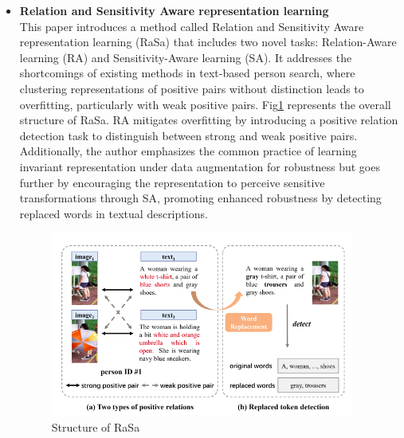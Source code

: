 \begin{itemize}
    \item \textbf{Relation and Sensitivity Aware representation learning}\\
    This paper introduces a method called Relation and Sensitivity Aware representation learning (RaSa) that includes two novel tasks: Relation-Aware learning (RA) and Sensitivity-Aware learning (SA). It addresses the shortcomings of existing methods in text-based person search, where clustering representations of positive pairs without distinction leads to overfitting, particularly with weak positive pairs. Fig\ref{fig:rasa} represents the overall structure of RaSa. RA mitigates overfitting by introducing a positive relation detection task to distinguish between strong and weak positive pairs. Additionally, the author emphasizes the common practice of learning invariant representation under data augmentation for robustness but goes further by encouraging the representation to perceive sensitive transformations through SA, promoting enhanced robustness by detecting replaced words in textual descriptions.
    \begin{figure}[htbp]
        \begin{center}
            \includegraphics[width=10cm]{img/rasa.png}
            \caption{Structure of RaSa}\label{fig:rasa}
        \end{center}
    \end{figure}
    

\end{itemize}
